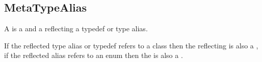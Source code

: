 \subsection{MetaTypeAlias}
\label{concept-MetaTypeAlias}

A  is a  and a 
reflecting a typedef or type alias.



If the reflected type alias or typedef refers to a class then the reflecting
 is also a , if the reflected alias refers
to an enum then the  is also a .
